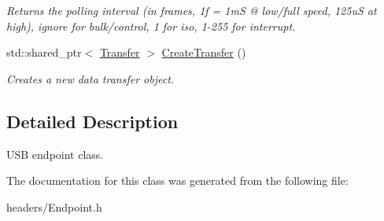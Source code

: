\begin{DoxyCompactItemize}
\begin{DoxyCompactList}\small\item\em Returns the polling interval (in frames, 1f = 1m\-S @ low/full speed, 125u\-S at high), ignore for bulk/control, 1 for iso, 1-\/255 for interrupt. \end{DoxyCompactList}\item 
\hypertarget{class_lib_u_s_b_1_1_endpoint_a70135be407240a2577da526217f4d742}{std\-::shared\-\_\-ptr$<$ \hyperlink{class_lib_u_s_b_1_1_transfer}{Transfer} $>$ \hyperlink{class_lib_u_s_b_1_1_endpoint_a70135be407240a2577da526217f4d742}{Create\-Transfer} ()}\label{class_lib_u_s_b_1_1_endpoint_a70135be407240a2577da526217f4d742}

\begin{DoxyCompactList}\small\item\em Creates a new data transfer object. \end{DoxyCompactList}\end{DoxyCompactItemize}


\subsection{Detailed Description}
U\-S\-B endpoint class. 

The documentation for this class was generated from the following file\-:\begin{DoxyCompactItemize}
\item 
headers/Endpoint.\-h\end{DoxyCompactItemize}
